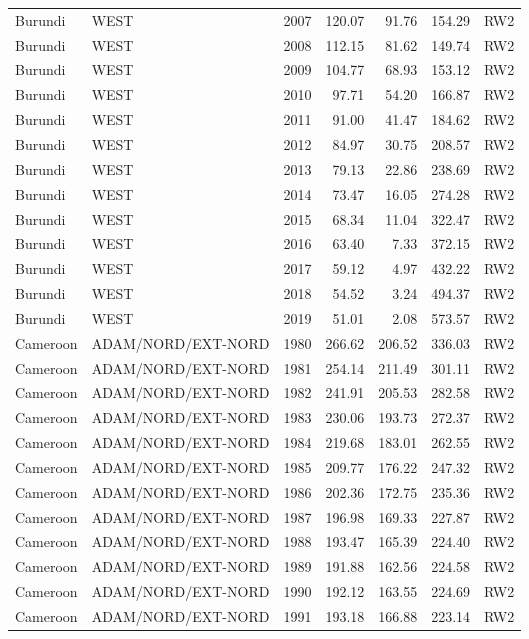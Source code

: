 \begin{longtable}{lllrrrl}
  Burundi & WEST & 2007 & 120.07 & 91.76 & 154.29 & RW2 \\ 
  Burundi & WEST & 2008 & 112.15 & 81.62 & 149.74 & RW2 \\ 
  Burundi & WEST & 2009 & 104.77 & 68.93 & 153.12 & RW2 \\ 
  Burundi & WEST & 2010 & 97.71 & 54.20 & 166.87 & RW2 \\ 
  Burundi & WEST & 2011 & 91.00 & 41.47 & 184.62 & RW2 \\ 
  Burundi & WEST & 2012 & 84.97 & 30.75 & 208.57 & RW2 \\ 
  Burundi & WEST & 2013 & 79.13 & 22.86 & 238.69 & RW2 \\ 
  Burundi & WEST & 2014 & 73.47 & 16.05 & 274.28 & RW2 \\ 
  Burundi & WEST & 2015 & 68.34 & 11.04 & 322.47 & RW2 \\ 
  Burundi & WEST & 2016 & 63.40 & 7.33 & 372.15 & RW2 \\ 
  Burundi & WEST & 2017 & 59.12 & 4.97 & 432.22 & RW2 \\ 
  Burundi & WEST & 2018 & 54.52 & 3.24 & 494.37 & RW2 \\ 
  Burundi & WEST & 2019 & 51.01 & 2.08 & 573.57 & RW2 \\ 
  Cameroon & ADAM/NORD/EXT-NORD & 1980 & 266.62 & 206.52 & 336.03 & RW2 \\ 
  Cameroon & ADAM/NORD/EXT-NORD & 1981 & 254.14 & 211.49 & 301.11 & RW2 \\ 
  Cameroon & ADAM/NORD/EXT-NORD & 1982 & 241.91 & 205.53 & 282.58 & RW2 \\ 
  Cameroon & ADAM/NORD/EXT-NORD & 1983 & 230.06 & 193.73 & 272.37 & RW2 \\ 
  Cameroon & ADAM/NORD/EXT-NORD & 1984 & 219.68 & 183.01 & 262.55 & RW2 \\ 
  Cameroon & ADAM/NORD/EXT-NORD & 1985 & 209.77 & 176.22 & 247.32 & RW2 \\ 
  Cameroon & ADAM/NORD/EXT-NORD & 1986 & 202.36 & 172.75 & 235.36 & RW2 \\ 
  Cameroon & ADAM/NORD/EXT-NORD & 1987 & 196.98 & 169.33 & 227.87 & RW2 \\ 
  Cameroon & ADAM/NORD/EXT-NORD & 1988 & 193.47 & 165.39 & 224.40 & RW2 \\ 
  Cameroon & ADAM/NORD/EXT-NORD & 1989 & 191.88 & 162.56 & 224.58 & RW2 \\ 
  Cameroon & ADAM/NORD/EXT-NORD & 1990 & 192.12 & 163.55 & 224.69 & RW2 \\ 
  Cameroon & ADAM/NORD/EXT-NORD & 1991 & 193.18 & 166.88 & 223.14 & RW2 \\ 

\end{longtable}
